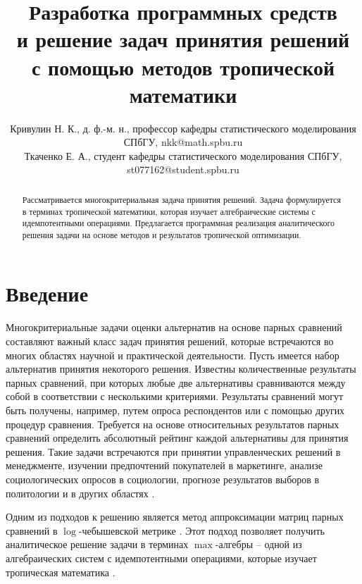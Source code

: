 \documentclass{spisok-article}
\title{Разработка программных средств\\ и решение задач принятия решений\\ с помощью методов тропической математики}
\author{Кривулин Н. К., 
д. ф.-м. н., профессор кафедры статистического
моделирования СПбГУ, nkk@math.spbu.ru\\
  Ткаченко Е. А., студент кафедры статистического моделирования
СПбГУ, st077162@student.spbu.ru}
\begin{document}
\maketitle

\begin{abstract}
Рассматривается многокритериальная задача принятия решений. Задача формулируется в терминах тропической математики, которая изучает алгебраические системы с идемпотентными операциями. Предлагается программная реализация аналитического решения задачи на основе методов и результатов тропической оптимизации.

\end{abstract}

\section{Введение}

Многокритериальные задачи оценки альтернатив на основе парных сравнений составляют важный класс задач принятия решений, которые встречаются во многих областях научной и практической деятельности. Пусть имеется набор альтернатив принятия некоторого решения. Известны количественные результаты парных сравнений, при которых любые две альтернативы сравниваются между собой в соответствии с несколькими критериями. Результаты сравнений могут быть получены, например, путем опроса респондентов или с помощью других процедур сравнения. Требуется на основе относительных результатов парных сравнений определить абсолютный рейтинг каждой альтернативы для принятия решения. Такие задачи встречаются при принятии управленческих решений в менеджменте, изучении предпочтений покупателей в маркетинге, анализе социологических опросов в социологии, прогнозе результатов выборов в политологии и в других областях \cite{Saaty1993Prinyatie}. 

Одним из подходов к решению является метод аппроксимации матриц парных сравнений в $\log$-чебышевской метрике \cite{Krivulin2019Metody,Krivulin2019Tropical,Krivulin2022Using,Krivulin2020Reshenie}. Этот подход позволяет получить аналитическое решение задачи в терминах $\max$-алгебры -- одной из алгебраических систем с идемпотентными операциями, которые изучает тропическая математика \cite{Maslov1994Idemotent, Butkovic2010Maxlinear, Heidergott2006Max}.
\end{document}
